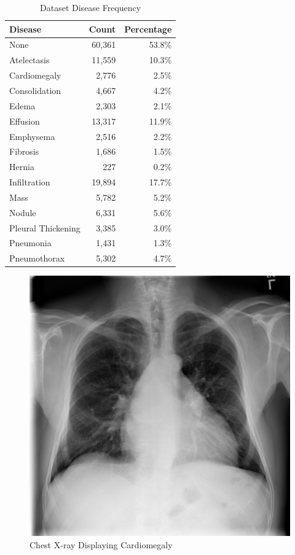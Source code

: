 \documentclass[letterpaper]{article} %
\begin{document}
\begin{table}[h!]
\centering
\begin{tabular}{|l|r|r|}
\hline
\textbf{Disease} & \textbf{Count} & \textbf{Percentage} \\
\hline
None & 60,361 & 53.8\% \\
Atelectasis & 11,559 & 10.3\% \\
Cardiomegaly & 2,776 & 2.5\% \\
Consolidation & 4,667 & 4.2\% \\
Edema & 2,303 & 2.1\% \\
Effusion & 13,317 & 11.9\% \\
Emphysema & 2,516 & 2.2\% \\
Fibrosis & 1,686 & 1.5\% \\
Hernia & 227 & 0.2\% \\
Infiltration & 19,894 & 17.7\% \\
Mass & 5,782 & 5.2\% \\
Nodule & 6,331 & 5.6\% \\
Pleural Thickening & 3,385 & 3.0\% \\
Pneumonia & 1,431 & 1.3\% \\
Pneumothorax & 5,302 & 4.7\% \\
\hline
\end{tabular}
\caption{Dataset Disease Frequency}
\label{tab:dataset-statistics}
\end{table}

\begin{figure}[h!]
\centering
\includegraphics[width=0.9\columnwidth]{cxr.png}
\caption{Chest X-ray Displaying Cardiomegaly}
\label{fig:cxr}
\end{figure}
\end{document}
